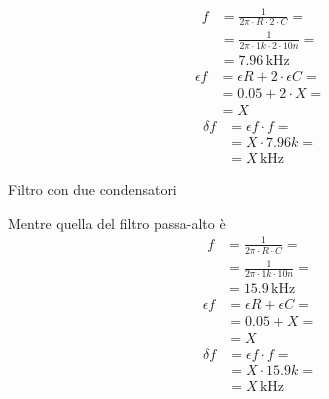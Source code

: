 \documentclass[a4paper]{article}
\begin{document}
			\begin{minipage}[t]{0.5\textwidth}
				\centering
				\begin{equation*}
					\begin{split}
						f &= \frac{1}{2 \pi \cdot R \cdot 2 \cdot C} = \\
						  &= \frac{1}{2 \pi \cdot 1k \cdot 2 \cdot 10n} = \\
						  &= 7.96 \, \mathrm{kHz}
					\end{split}
				\end{equation*}
				\newline
				\begin{equation*}
					\begin{split}
						\epsilon f &= \epsilon R + 2 \cdot\epsilon C = \\
								   &= 0.05 + 2 \cdot X = \\
								   &= X
					\end{split}
				\end{equation*}
				\newline
				\begin{equation*}
					\begin{split}
						\delta f &= \epsilon f \cdot f = \\
								 &= X \cdot 7.96k = \\
								 &= X \, \mathrm{kHz}
					\end{split}
				\end{equation*}
				\newline
				\begin{scriptsize}
					Filtro con due condensatori
				\end{scriptsize}
			\end{minipage}
			Mentre quella del filtro passa-alto è
			\begin{equation*}
				\begin{split}
					f &= \frac{1}{2 \pi \cdot R \cdot C} = \\
					  &= \frac{1}{2 \pi \cdot 1k \cdot 10n} = \\
					  &= 15.9 \, \mathrm{kHz}
				\end{split}
			\end{equation*}
			\newline
			\begin{equation*}
				\begin{split}
					\epsilon f &= \epsilon R + \epsilon C = \\
							   &= 0.05 + X = \\
							   &= X
				\end{split}
			\end{equation*}
			\newline
			\begin{equation*}
				\begin{split}
					\delta f &= \epsilon f \cdot f = \\
							 &= X \cdot 15.9k = \\
							 &= X \, \mathrm{kHz}
				\end{split}
			\end{equation*}
\end{document}

